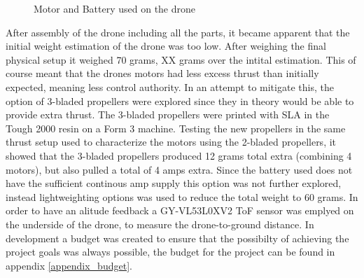 \begin{figure}[H]%
    \centering
    \qquad
    \caption{Motor and Battery used on the drone}%
    \label{fig:example}%
\end{figure}

After assembly of the drone including all the parts, it became apparent that the initial weight estimation of the drone was too low. After weighing the final physical setup it weighed 70 grams, XX grams over the intital estimation. This of course meant that the drones motors had less excess thrust than initially expected, meaning less control authority. In an attempt to mitigate this, the option of 3-bladed propellers were explored since they in theory would be able to provide extra thrust. The 3-bladed propellers were printed with SLA in the Tough 2000 resin on a Form 3 machine. Testing the new propellers in the same thrust setup used to characterize the motors using the 2-bladed propellers, it showed that the 3-bladed propellers produced 12 grams total extra (combining 4 motors), but also pulled a total of 4 amps extra. Since the battery used does not have the sufficient continous amp supply this option was not further explored, instead lightweighting options was used to reduce the total weight to 60 grams. In order to have an alitude feedback a GY-VL53L0XV2 ToF sensor was emplyed on the underside of the drone, to measure the drone-to-ground distance. In development a budget was created to ensure that the possibilty of achieving the project goals was always possible, the budget for the project can be found in appendix \ref{appendix_budget}.
